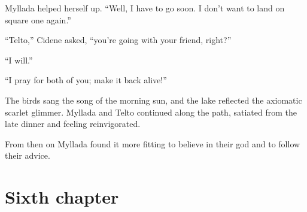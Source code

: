 Myllada helped herself up. ``Well, I have to go soon. I don't want to land on square one again.''

``Telto,'' Cidene asked, ``you're going with your friend, right?''

``I will.''

``I pray for both of you; make it back alive!''

The birds sang the song of the morning sun, and the lake reflected the axiomatic scarlet glimmer. Myllada and Telto continued along the path, satiated from the late dinner and feeling reinvigorated.

From then on Myllada found it more fitting to believe in their god and to follow their advice.

\chapter{Sixth chapter}

